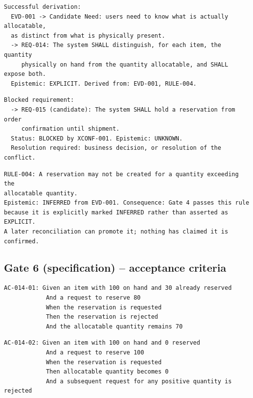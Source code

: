 \documentclass[11pt,a4paper]{article}
\begin{document}
\begin{Verbatim}[fontsize=\footnotesize,breaklines=true,breakanywhere=true,breakautoindent=false,samepage=false]
Successful derivation:
  EVD-001 -> Candidate Need: users need to know what is actually allocatable,
  as distinct from what is physically present.
  -> REQ-014: The system SHALL distinguish, for each item, the quantity
     physically on hand from the quantity allocatable, and SHALL expose both.
  Epistemic: EXPLICIT. Derived from: EVD-001, RULE-004.
\end{Verbatim}

\begin{Verbatim}[fontsize=\footnotesize,breaklines=true,breakanywhere=true,breakautoindent=false,samepage=false]
Blocked requirement:
  -> REQ-015 (candidate): The system SHALL hold a reservation from order
     confirmation until shipment.
  Status: BLOCKED by XCONF-001. Epistemic: UNKNOWN.
  Resolution required: business decision, or resolution of the conflict.
\end{Verbatim}

\begin{Verbatim}[fontsize=\footnotesize,breaklines=true,breakanywhere=true,breakautoindent=false,samepage=false]
RULE-004: A reservation may not be created for a quantity exceeding the
allocatable quantity.
Epistemic: INFERRED from EVD-001. Consequence: Gate 4 passes this rule
because it is explicitly marked INFERRED rather than asserted as EXPLICIT.
A later reconciliation can promote it; nothing has claimed it is confirmed.
\end{Verbatim}

\subsection{Gate 6 (specification) -- acceptance criteria}

\begin{Verbatim}[fontsize=\footnotesize,breaklines=true,breakanywhere=true,breakautoindent=false,samepage=false]
AC-014-01: Given an item with 100 on hand and 30 already reserved
            And a request to reserve 80
            When the reservation is requested
            Then the reservation is rejected
            And the allocatable quantity remains 70
\end{Verbatim}

\begin{Verbatim}[fontsize=\footnotesize,breaklines=true,breakanywhere=true,breakautoindent=false,samepage=false]
AC-014-02: Given an item with 100 on hand and 0 reserved
            And a request to reserve 100
            When the reservation is requested
            Then allocatable quantity becomes 0
            And a subsequent request for any positive quantity is rejected
\end{Verbatim}
\end{document}
